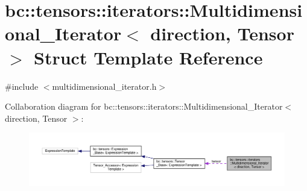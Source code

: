 \hypertarget{structbc_1_1tensors_1_1iterators_1_1Multidimensional__Iterator}{}\section{bc\+:\+:tensors\+:\+:iterators\+:\+:Multidimensional\+\_\+\+Iterator$<$ direction, Tensor $>$ Struct Template Reference}
\label{structbc_1_1tensors_1_1iterators_1_1Multidimensional__Iterator}


{\ttfamily \#include $<$multidimensional\+\_\+iterator.\+h$>$}



Collaboration diagram for bc\+:\+:tensors\+:\+:iterators\+:\+:Multidimensional\+\_\+\+Iterator$<$ direction, Tensor $>$\+:\nopagebreak
\begin{figure}[H]
\begin{center}
\leavevmode
\includegraphics[width=350pt]{structbc_1_1tensors_1_1iterators_1_1Multidimensional__Iterator__coll__graph}
\end{center}
\end{figure}
